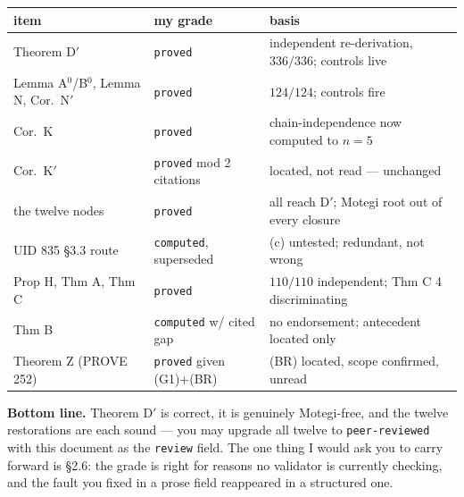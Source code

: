 \documentclass[11pt,a4paper]{article}
\begin{document}
\begin{center}
\begin{tabular}{lll}
\toprule
item & my grade & basis \\
\midrule
Theorem D$'$ & \texttt{proved} & independent re-derivation, $336/336$; controls live \\
Lemma A$^0$/B$^0$, Lemma N, Cor.\ N$'$ & \texttt{proved} & $124/124$; controls fire \\
Cor.\ K & \texttt{proved} & chain-independence now computed to $n=5$ \\
Cor.\ K$'$ & \texttt{proved} mod 2 citations & located, not read --- unchanged \\
the twelve nodes & \texttt{proved} & all reach D$'$; Motegi root out of every closure \\
UID 835 \S3.3 route & \texttt{computed}, superseded & (c) untested; redundant, not wrong \\
Prop H, Thm A, Thm C & \texttt{proved} & $110/110$ independent; Thm C 4 discriminating \\
Thm B & \texttt{computed} w/ cited gap & no endorsement; antecedent located only \\
Theorem Z (PROVE 252) & \texttt{proved} given (G1)+(BR) & (BR) located, scope confirmed, unread \\
\bottomrule
\end{tabular}
\end{center}

\noindent\textbf{Bottom line.} Theorem D$'$ is correct, it is genuinely Motegi-free, and the twelve
restorations are each sound --- you may upgrade all twelve to \texttt{peer-reviewed} with this
document as the \texttt{review} field. The one thing I would ask you to carry forward is \S2.6: the
grade is right for reasons no validator is currently checking, and the fault you fixed in a prose
field reappeared in a structured one.
\end{document}
